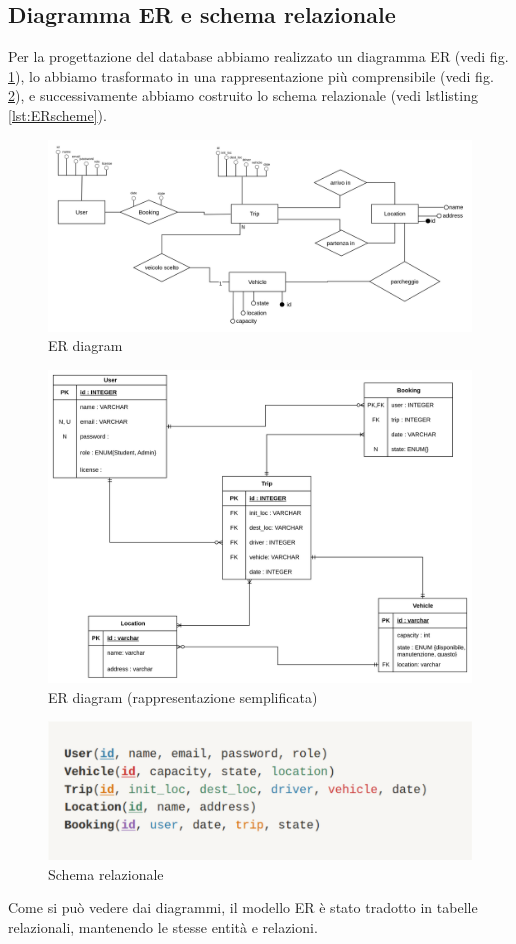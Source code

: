 \subsection{Diagramma ER e schema relazionale}\label{subsec:DB}
Per la progettazione del database abbiamo realizzato un diagramma ER (vedi fig. \ref{fig:ERdiag}), lo abbiamo trasformato in una rappresentazione più comprensibile (vedi fig. \ref{fig:ERraw}), e successivamente abbiamo costruito lo schema relazionale (vedi lstlisting \ref{lst:ERscheme}).
\begin{figure}[H]
    \centering
    \includegraphics[width=1\linewidth]{Images/ER_diagram.png}
    \caption{ER diagram}
    \label{fig:ERdiag}
\end{figure}
\begin{figure}[H]
    \centering
    \includegraphics[width=1\linewidth]{Images/ERraw.png}
    \caption{ER diagram (rappresentazione semplificata)}
    \label{fig:ERraw}
\end{figure}
\begin{figure}[H]
    \centering
    \includegraphics[width=0.7\linewidth]{Images/schema_relazionale.png}
    \caption{Schema relazionale}
    \label{fig:ERscheme}
\end{figure}
Come si può  vedere dai diagrammi, il modello ER è stato tradotto in tabelle relazionali, mantenendo le stesse entità e relazioni.